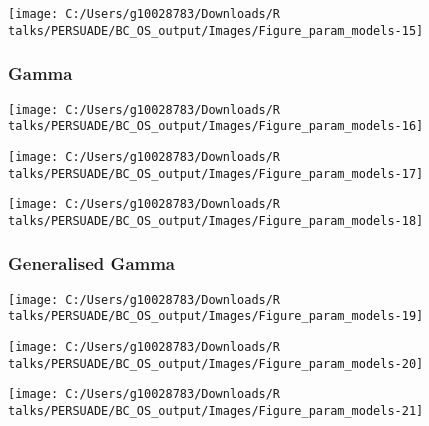 \documentclass[
]{article}
\begin{document}
\begin{flushleft}\texttt{[image: C:/Users/g10028783/Downloads/R talks/PERSUADE/BC\_OS\_output/Images/Figure\_param\_models-15]} \end{flushleft}

\clearpage

\subsubsection{Gamma}\label{gamma}

\begin{flushleft}\texttt{[image: C:/Users/g10028783/Downloads/R talks/PERSUADE/BC\_OS\_output/Images/Figure\_param\_models-16]} \end{flushleft}

\begin{flushleft}\texttt{[image: C:/Users/g10028783/Downloads/R talks/PERSUADE/BC\_OS\_output/Images/Figure\_param\_models-17]} \end{flushleft}

\begin{flushleft}\texttt{[image: C:/Users/g10028783/Downloads/R talks/PERSUADE/BC\_OS\_output/Images/Figure\_param\_models-18]} \end{flushleft}

\clearpage

\subsubsection{Generalised Gamma}\label{generalised-gamma}

\begin{flushleft}\texttt{[image: C:/Users/g10028783/Downloads/R talks/PERSUADE/BC\_OS\_output/Images/Figure\_param\_models-19]} \end{flushleft}

\begin{flushleft}\texttt{[image: C:/Users/g10028783/Downloads/R talks/PERSUADE/BC\_OS\_output/Images/Figure\_param\_models-20]} \end{flushleft}

\begin{flushleft}\texttt{[image: C:/Users/g10028783/Downloads/R talks/PERSUADE/BC\_OS\_output/Images/Figure\_param\_models-21]} \end{flushleft}

\clearpage
\end{document}
